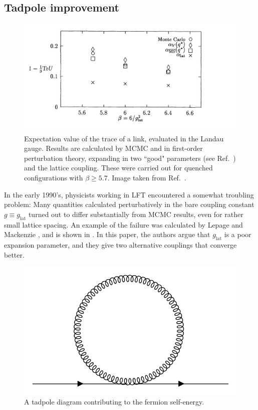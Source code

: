 \subsection{Tadpole improvement}

\begin{figure}
  \centering
  \includegraphics[width=\linewidth]{figs/averageLink.png}
  \caption{Expectation value of the trace of a link, evaluated in the
           Landau gauge. Results are calculated by MCMC and in first-order
           perturbation theory, expanding in two ``good" parameters
           (see Ref.~\cite{lepage_viability_1993}) and the lattice
           coupling. These were carried out for quenched configurations
           with $\beta\geq5.7$. Image taken from 
           Ref.~\cite{lepage_viability_1993}.}
  \label{fig:averageLink}
\end{figure}

In the early 1990's, physicists working in LFT encountered
a somewhat troubling problem: Many quantities calculated perturbatively
in the bare coupling constant $g\equiv g_\text{lat}$ turned out to differ
substantially from MCMC results, even for rather small lattice spacing.
An example of the failure was calculated by Lepage and Mackenzie
\cite{lepage_viability_1993}, and is shown in .
In this paper, the authors argue that $g_\text{lat}$ is a poor expansion
parameter, and they give two alternative couplings that converge better.

\begin{figure}
  \centering
  \includegraphics[width=0.5\linewidth]{figs/tadpole.png}
  \caption{A tadpole diagram contributing to the fermion self-energy.}
  \label{fig:tadpole}
\end{figure}

